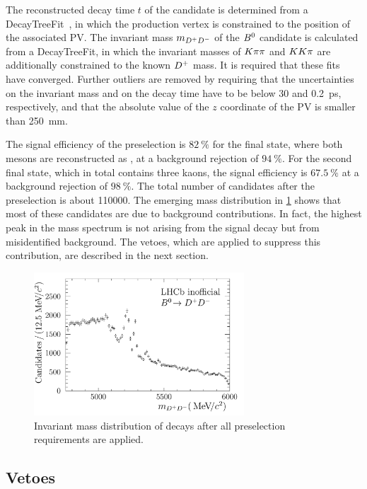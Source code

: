 The reconstructed decay time $t$ of the \Bd candidate is determined from a
DecayTreeFit~\cite{Hulsbergen:2005pu}, in which the \Bd production vertex is
constrained to the position of the associated PV. The invariant mass
$m_{{{D}^+}{{D}^-}}$ of the ${{B}^0}$ candidate is calculated from a DecayTreeFit, in
which the invariant masses of $K\pi\pi$ and $KK\pi$ are additionally
constrained to the known ${{D}^+}$ mass. It is required that these fits have
converged. Further outliers are removed by requiring that the uncertainties on
the invariant mass and on the decay time have to be below \SI{30}{\MeVcc} and
\SI{0.2}{\ps}, respectively, and that the absolute value of the $z$ coordinate
of the PV is smaller than \SI{250}{\milli\meter}.

The signal efficiency of the preselection is $\SI{82}{\percent}$ for the final
state, where both \Dpm mesons are reconstructed as \Kpipi, at a background
rejection of $\SI{94}{\percent}$. For the second final state, which in total
contains three kaons, the signal efficiency is $\SI{67.5}{\percent}$ at a
background rejection of $\SI{98}{\percent}$. The total number of candidates
after the preselection is about \num{110000}. The emerging mass distribution
in \cref{fig:b02dd:selection:mass_afterpreselection} shows that most of these
candidates are due to background contributions. In fact, the highest peak in
the mass spectrum is not arising from the signal decay but from misidentified
background. The vetoes, which are applied to suppress this contribution, are
described in the next section.
\begin{figure}[hbt]
\centering
\includegraphics[width=0.7\textwidth]{07-B02DD/tikz/pdf/obsMass_afterPreselection.pdf}
\caption{Invariant mass distribution of \BdToDD decays after all preselection
requirements are applied.}
\label{fig:b02dd:selection:mass_afterpreselection}
\end{figure}

\subsection{Vetoes}
\label{sec:b02dd:selection:vetoes}

